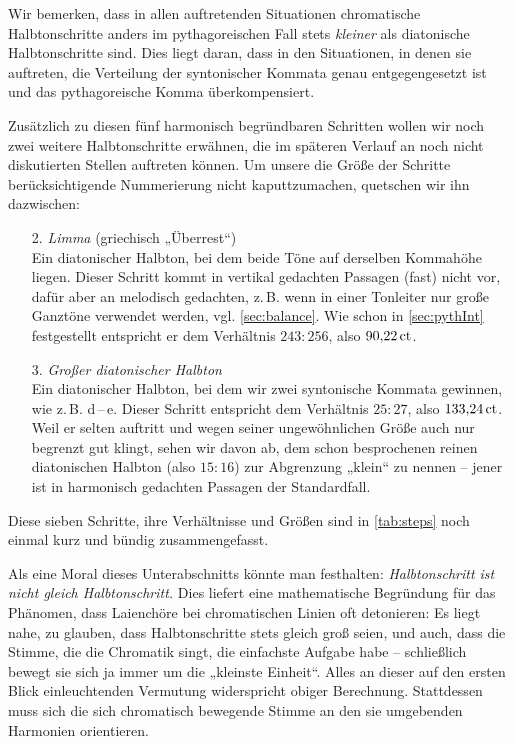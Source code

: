 Wir bemerken, dass in allen auftretenden Situationen chromatische
Halbtonschritte anders im pythagoreischen Fall stets \emph{kleiner} als
diatonische Halbtonschritte sind.  Dies liegt daran, dass in den Situationen,
in denen sie auftreten, die Verteilung der syntonischer Kommata genau
entgegengesetzt ist und das pythagoreische Komma überkompensiert.

Zusätzlich zu diesen fünf harmonisch begründbaren Schritten wollen wir noch zwei
weitere Halbtonschritte erwähnen, die im späteren Verlauf an noch nicht
diskutierten Stellen auftreten können. Um unsere die Größe der Schritte
berücksichtigende Nummerierung nicht kaputtzumachen, quetschen wir ihn dazwischen:

\begin{enumerate}
\item[2\pazofrac12.] \emph{Limma} (griechisch „Überrest“)\\
  Ein diatonischer Halbton, bei dem beide Töne auf derselben Kommahöhe liegen.
  Dieser Schritt kommt in vertikal gedachten Passagen (fast) nicht vor, dafür
  aber an melodisch gedachten, z.\,B. wenn in einer Tonleiter nur große Ganztöne
  verwendet werden, vgl. \cref{sec:balance}. Wie schon in \cref{sec:pythInt}
  festgestellt entspricht er dem Verhältnis $243:256$, also $90{,}22\,\text{ct}$.
\item[3\pazofrac12.] \emph{Großer diatonischer Halbton}\\
  Ein diatonischer Halbton, bei dem wir zwei syntonische Kommata gewinnen, wie
  z.\,B. \naturalm d\,–\,\flatp e. Dieser Schritt entspricht dem Verhältnis
  $25:27$, also $133{,}24\,\text{ct}$. Weil er selten auftritt und wegen seiner
  ungewöhnlichen Größe auch nur begrenzt gut klingt, sehen wir davon ab, dem
  schon besprochenen reinen diatonischen Halbton (also $15:16$) zur Abgrenzung
  „klein“ zu nennen – jener ist in harmonisch gedachten Passagen der
  Standardfall.
\end{enumerate}
  
Diese sieben Schritte, ihre Verhältnisse und Größen sind in \cref{tab:steps}
noch einmal kurz und bündig zusammengefasst.

Als eine Moral dieses Unterabschnitts könnte man festhalten:
\emph{Halbtonschritt ist nicht gleich Halbtonschritt.}  Dies liefert eine
mathematische Begründung für das Phänomen, dass Laienchöre bei chromatischen
Linien oft detonieren: Es liegt nahe, zu glauben, dass Halbtonschritte stets
gleich groß seien, und auch, dass die Stimme, die die Chromatik singt, die
einfachste Aufgabe habe – schließlich bewegt sie sich ja immer um die „kleinste
Einheit“. Alles an dieser auf den ersten Blick einleuchtenden Vermutung
widerspricht obiger Berechnung.  Stattdessen muss sich die sich chromatisch
bewegende Stimme an den sie umgebenden Harmonien orientieren.

